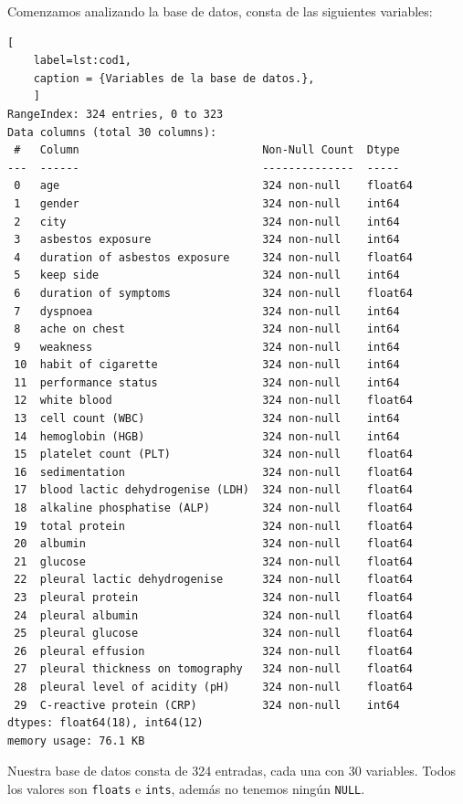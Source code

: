 \documentclass{article}
\begin{document}
Comenzamos analizando la base de datos,  consta de las siguientes
variables:
\begin{lstlisting}[
	label=lst:cod1,
	caption = {Variables de la base de datos.},
	]
RangeIndex: 324 entries, 0 to 323
Data columns (total 30 columns):
 #   Column                            Non-Null Count  Dtype
---  ------                            --------------  -----
 0   age                               324 non-null    float64
 1   gender                            324 non-null    int64
 2   city                              324 non-null    int64
 3   asbestos exposure                 324 non-null    int64
 4   duration of asbestos exposure     324 non-null    float64
 5   keep side                         324 non-null    int64
 6   duration of symptoms              324 non-null    float64
 7   dyspnoea                          324 non-null    int64
 8   ache on chest                     324 non-null    int64
 9   weakness                          324 non-null    int64
 10  habit of cigarette                324 non-null    int64
 11  performance status                324 non-null    int64
 12  white blood                       324 non-null    float64
 13  cell count (WBC)                  324 non-null    int64
 14  hemoglobin (HGB)                  324 non-null    int64
 15  platelet count (PLT)              324 non-null    float64
 16  sedimentation                     324 non-null    float64
 17  blood lactic dehydrogenise (LDH)  324 non-null    float64
 18  alkaline phosphatise (ALP)        324 non-null    float64
 19  total protein                     324 non-null    float64
 20  albumin                           324 non-null    float64
 21  glucose                           324 non-null    float64
 22  pleural lactic dehydrogenise      324 non-null    float64
 23  pleural protein                   324 non-null    float64
 24  pleural albumin                   324 non-null    float64
 25  pleural glucose                   324 non-null    float64
 26  pleural effusion                  324 non-null    float64
 27  pleural thickness on tomography   324 non-null    float64
 28  pleural level of acidity (pH)     324 non-null    float64
 29  C-reactive protein (CRP)          324 non-null    int64
dtypes: float64(18), int64(12)
memory usage: 76.1 KB
\end{lstlisting}

Nuestra base de datos consta de 324 entradas, cada una  con 30
variables. Todos los valores son \lstinline{floats} e
\lstinline{ints}, además no tenemos ningún \lstinline{NULL}.
\end{document}
